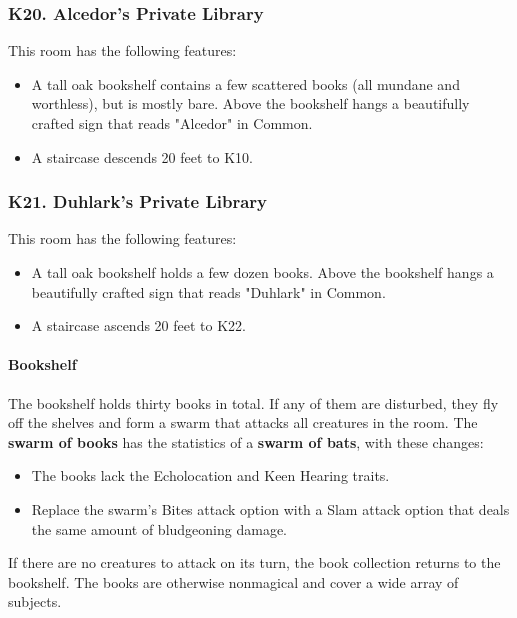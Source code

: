\documentclass[10pt,a4paper,twoside,twocolumn,openany,nodeprecatedcode]{dndbook}
\begin{document}
\subsubsection{K20. Alcedor's Private Library}
This room has the following features:
\begin{itemize}

\item A tall oak bookshelf contains a few scattered books (all mundane and worthless), but is mostly bare. Above the bookshelf hangs a beautifully crafted sign that reads "Alcedor" in Common.
\item A staircase descends 20 feet to K10.
\end{itemize}


\subsubsection{K21. Duhlark's Private Library}
This room has the following features:
\begin{itemize}

\item A tall oak bookshelf holds a few dozen books. Above the bookshelf hangs a beautifully crafted sign that reads "Duhlark" in Common.
\item A staircase ascends 20 feet to K22.
\end{itemize}


\paragraph{Bookshelf}
The bookshelf holds thirty books in total. If any of them are disturbed, they fly off the shelves and form a swarm that attacks all creatures in the room. The \textbf{swarm of books} has the statistics of a \textbf{swarm of bats}, with these changes:
\begin{itemize}

\item The books lack the Echolocation and Keen Hearing traits.
\item Replace the swarm's Bites attack option with a Slam attack option that deals the same amount of bludgeoning damage.
\end{itemize}


If there are no creatures to attack on its turn, the book collection returns to the bookshelf. The books are otherwise nonmagical and cover a wide array of subjects.
\end{document}
